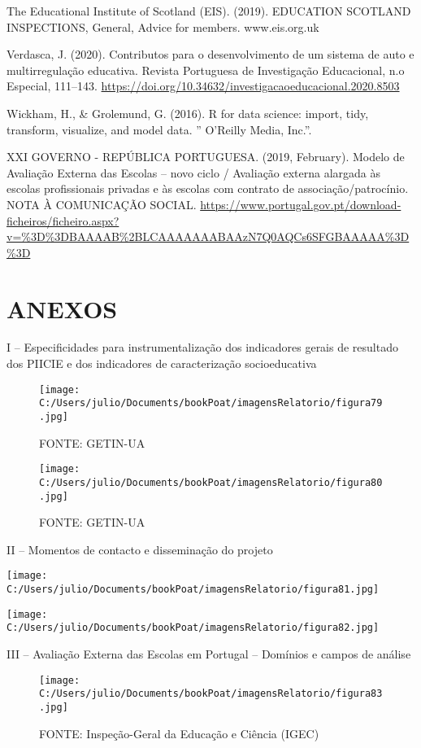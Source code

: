 \documentclass[
]{book}
\begin{document}
The Educational Institute of Scotland (EIS). (2019). EDUCATION SCOTLAND INSPECTIONS, General, Advice for members. www.eis.org.uk

Verdasca, J. (2020). Contributos para o desenvolvimento de um sistema de auto e multirregulação educativa. Revista Portuguesa de Investigação Educacional, n.o Especial, 111--143. \url{https://doi.org/10.34632/investigacaoeducacional.2020.8503}

Wickham, H., \& Grolemund, G. (2016). R for data science: import, tidy, transform, visualize, and model data. '' O'Reilly Media, Inc.''.

XXI GOVERNO - REPÚBLICA PORTUGUESA. (2019, February). Modelo de Avaliação Externa das Escolas -- novo ciclo / Avaliação externa alargada às escolas profissionais privadas e às escolas com contrato de associação/patrocínio. NOTA À COMUNICAÇÃO SOCIAL. \url{https://www.portugal.gov.pt/download-ficheiros/ficheiro.aspx?v=\%3D\%3DBAAAAB\%2BLCAAAAAAABAAzN7Q0AQCs6SFGBAAAAA\%3D\%3D}

\hypertarget{anexos}{%
\chapter*{\texorpdfstring{\textbf{ANEXOS}}{ANEXOS}}\label{anexos}}

I -- Especificidades para instrumentalização dos indicadores gerais de resultado dos PIICIE e dos indicadores de caracterização socioeducativa

\begin{figure}
\centering
\texttt{[image: C:/Users/julio/Documents/bookPoat/imagensRelatorio/figura79.jpg]}
\caption{FONTE: GETIN-UA}
\end{figure}

\begin{figure}
\centering
\texttt{[image: C:/Users/julio/Documents/bookPoat/imagensRelatorio/figura80.jpg]}
\caption{FONTE: GETIN-UA}
\end{figure}

II -- Momentos de contacto e disseminação do projeto

\texttt{[image: C:/Users/julio/Documents/bookPoat/imagensRelatorio/figura81.jpg]}

\texttt{[image: C:/Users/julio/Documents/bookPoat/imagensRelatorio/figura82.jpg]}

III -- Avaliação Externa das Escolas em Portugal -- Domínios e campos de análise

\begin{figure}
\centering
\texttt{[image: C:/Users/julio/Documents/bookPoat/imagensRelatorio/figura83.jpg]}
\caption{FONTE: Inspeção-Geral da Educação e Ciência (IGEC)}
\end{figure}
\end{document}
